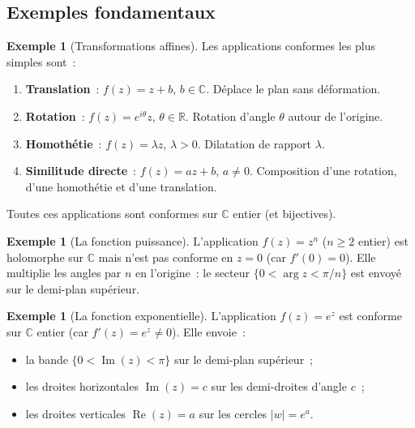 \documentclass[12pt,a4paper,openany]{book}
\theoremstyle{definition}
\newtheorem{exemple}[definition]{Exemple}
\theoremstyle{plain}
\theoremstyle{remark}
\newcommand{\C}{\mathbb{C}}
\newcommand{\R}{\mathbb{R}}
\DeclareMathOperator{\re}{Re}
\DeclareMathOperator{\im}{Im}
\newcommand{\abs}[1]{\left|#1\right|}
\begin{document}
\subsection{Exemples fondamentaux}

\begin{exemple}[Transformations affines]\label{ex:affines}
Les applications conformes les plus simples sont~:
\begin{enumerate}[label=\textbf{\arabic*.}]
  \item \textbf{Translation}~: $f(z) = z + b$, $b \in \C$. Déplace le plan sans déformation.
  \item \textbf{Rotation}~: $f(z) = e^{i\theta} z$, $\theta \in \R$. Rotation
    d'angle $\theta$ autour de l'origine.
  \item \textbf{Homothétie}~: $f(z) = \lambda z$, $\lambda > 0$. Dilatation de
    rapport $\lambda$.
  \item \textbf{Similitude directe}~: $f(z) = az + b$, $a \neq 0$. Composition
    d'une rotation, d'une homothétie et d'une translation.
\end{enumerate}
Toutes ces applications sont conformes sur $\C$ entier (et bijectives).
\end{exemple}

\begin{exemple}[La fonction puissance]\label{ex:puissance}
L'application $f(z) = z^n$ ($n \geq 2$ entier) est holomorphe sur $\C$ mais
n'est pas conforme en $z = 0$ (car $f'(0) = 0$). Elle multiplie les angles
par $n$ en l'origine~: le secteur $\{0 < \arg z < \pi/n\}$ est envoyé sur
le demi-plan supérieur.
\end{exemple}

\begin{exemple}[La fonction exponentielle]\label{ex:exp-conforme}
L'application $f(z) = e^z$ est conforme sur $\C$ entier (car $f'(z) = e^z \neq 0$).
Elle envoie~:
\begin{itemize}
  \item la bande $\{0 < \im(z) < \pi\}$ sur le demi-plan supérieur~;
  \item les droites horizontales $\im(z) = c$ sur les demi-droites d'angle $c$~;
  \item les droites verticales $\re(z) = a$ sur les cercles $\abs{w} = e^a$.
\end{itemize}
\end{exemple}
\end{document}
